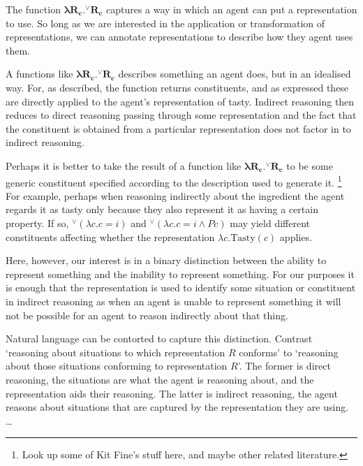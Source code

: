 \documentclass[10pt]{article}
\begin{document}
The function \(\bm{\lambda R_{c}.^{\lor}R_{c}}\) captures a way in which an agent can put a representation to use.
So long as we are interested in the application or transformation of representations, we can annotate representations to describe how they agent uses them.

A functions like \(\bm{\lambda R_{c}.^{\lor}R_{c}}\) describes something an agent does, but in an idealised way.
For, as described, the function returns constituents, and as expressed these are directly applied to the agent's representation of tasty.
Indirect reasoning then reduces to direct reasoning passing through some representation and the fact that the constituent is obtained from a particular representation does not factor in to indirect reasoning.

Perhaps it is better to take the result of a function like \(\bm{\lambda R_{c}.^{\lor}R_{c}}\) to be some generic constituent specified according to the description used to generate it.\nolinebreak
\footnote{\color{red} Look up some of Kit Fine's stuff here, and maybe other related literature.}
For example, perhaps when reasoning indirectly about the ingredient the agent regards it as tasty only because they also represent it as having a certain property.
If so, \(\bm{^{\lor}}(\lambda c.c = i)\) and \(\bm{^{\lor}}(\lambda c.c = i \land Pc)\) may yield different constituents affecting whether the representation \(\lambda c. \text{Tasty}(c)\) applies.

Here, however, our interest is in a binary distinction between the ability to represent something and the inability to represent something.
For our purposes it is enough that the representation is used to identify some situation or constituent in indirect reasoning as when an agent is unable to represent something it will not be possible for an agent to reason indirectly about that thing.

Natural language can be contorted to capture this distinction.
Contrast `reasoning about situations to which representation \(R\) conforms' to `reasoning about those situations conforming to representation \(R\)'.
The former is direct reasoning, the situations are what the agent is reasoning about, and the representation aids their reasoning.
The latter is indirect reasoning, the agent reasons about situations that are captured by the representation they are using.
{\color{red} \dots}
\end{document}
